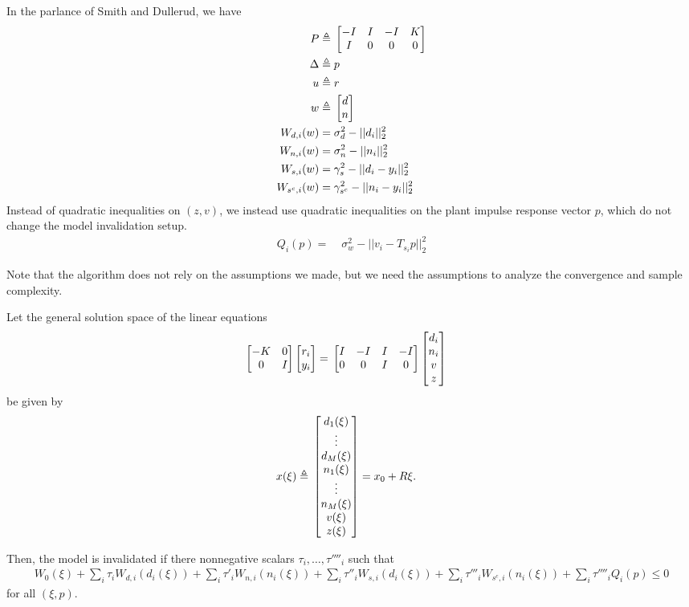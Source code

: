 \documentclass[11pt, onecolumn]{article}
\newcommand{\qq}[1]{{\color{magenta}{(#1)}}}
\newcommand{\rb}[1]{{\color{red}{ #1}}}
\begin{document}
\qq{Ross: make sure it is precise} \rb{I forget which covariance constraint things we came up with}
In the parlance of Smith and Dullerud, we have
\begin{align*}
P \triangleq &\; \begin{bmatrix}-I & I & -I & K\\I & 0 & 0 & 0\end{bmatrix}\\
\Delta \triangleq &\; p \\
u \triangleq &\; r \\
w \triangleq &\; \begin{bmatrix}d\\n\end{bmatrix}\\
W_{d,i}(w) = &\; \sigma_d^2 - ||d_i||_2^2\\
W_{n,i}(w) = &\; \sigma_n^2 - ||n_i||_2^2\\
W_{s,i}(w) = &\; \gamma_s^2 - ||d_i - y_i||_2^2\\
W_{s^c,i}(w) = &\; \gamma_{s^c}^2 - ||n_i - y_i||_2^2\\
\end{align*}
Instead of quadratic inequalities on $(z,v)$, we instead use quadratic inequalities on the plant impulse response vector $p$, which do not change the model invalidation setup.
\begin{align*}
Q_i(p) = &\; \sigma_w^2 - ||v_i - T_{s_i}p||_2^2 
\end{align*}
\rb{Todo: quadratic equality constraints}

\begin{remark}
  Note that the algorithm does not rely on the assumptions we made, but we need the assumptions to
  analyze the convergence and sample complexity.
\end{remark}

\begin{theorem}
  Let the general solution space of the linear equations
    \begin{align*}
      \begin{bmatrix}-K & 0\\0&I\end{bmatrix}\begin{bmatrix}r_i\\y_i\end{bmatrix} = &\; \begin{bmatrix}I&-I&I&-I\\0&0&I&0\end{bmatrix}\begin{bmatrix}d_i\\n_i\\v\\z\end{bmatrix}
    \end{align*}
  be given by \\
  \begin{align*}
    x(\xi) \triangleq&\; \begin{bmatrix}d_1(\xi)\\\vdots\\d_M(\xi)\\n_1(\xi)\\\vdots\\n_M(\xi)\\v(\xi)\\z(\xi)\end{bmatrix}= x_0 + R\xi.
  \end{align*}

  Then, the model is invalidated if there nonnegative scalars $\tau_i,\ldots,\tau''''_i$ such that
  \begin{align*}
   W_0(\xi) + \sum_i \tau_i W_{d,i}(d_i(\xi)) + \sum_i \tau'_i W_{n,i}(n_i(\xi)) + \sum_i \tau''_i W_{s,i}(d_i(\xi)) + \sum_i \tau'''_i W_{s^c,i}(n_i(\xi)) + \sum_i \tau''''_i Q_i(p) \leq 0
  \end{align*}
  for all $(\xi,p)$.
\end{theorem}
\end{document}
